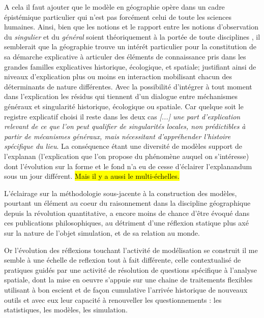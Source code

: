 A cela il faut ajouter que le modèle en géographie opère dans un cadre épistémique particulier qui n'est pas forcément celui de toute les sciences humaines. Ainsi, bien que les notions et le rapport entre les notions d'observation du \textit{singulier} et du \textit{général} soient théoriquement à la portée de toute disciplines \autocite{Dastes1992}, il semblerait que la géographie trouve un intérét particulier pour la constitution de sa démarche explicative à articuler des éléments de connaissance pris dans les grandes familles explicatives historique, écologique, et spatiale; justifiant ainsi de niveaux d'explication plus ou moins en interaction mobilisant chacun des déterminants de nature différentes. Avec la possibilité d'intégrer à tout moment dans l'explication les résidus qui tiennent d'un dialogue entre méchanismes généraux et singularité historique, écologique ou spatiale. Car quelque soit le registre explicatif choisi il reste dans les deux cas \textit{ [...] une part d'explication relevant de ce que l'on peut qualifier de singularités locales, non prédictibles à partir de mécanismes généraux, mais nécessitant d'appréhender l'histoire spécifique du lieu}. La conséquence étant une diversité de modèles support de l'explanan (l’explication que l’on propose du phénomène auquel on s’intéresse) dont l'évolution sur la forme et le fond n'a eu de cesse d'éclairer l'explanandum sous un jour différent. \autocite{Dastes1992, Sanders2000, Sanders2013} \hl{Mais il y a aussi le multi-échelles.}

L'éclairage sur la méthodologie sous-jacente à la construction des modèles, pourtant un élément au coeur du raisonnement dans la discipline géographique depuis la révolution quantitative, a encore moins de chance d'être évoqué dans ces publications philosophiques, au détriment d'une réflexion statique plus axé sur la nature de l'objet simulation, et de sa relation au monde.

Or l'évolution des réflexions touchant l'activité de modélisation se construit il me semble à une échelle de reflexion tout à fait différente, celle contextualisé de pratiques guidés par une activité de résolution de questions spécifique à l'analyse spatiale, dont la mise en oeuvre s'appuie sur une chaine de traitements flexibles utilisant à bon escient et de façon cumulative l'arrivée historique de nouveaux outils et avec eux leur capacité à renouveller les questionnements : les statistiques, les modèles, les simulation.


